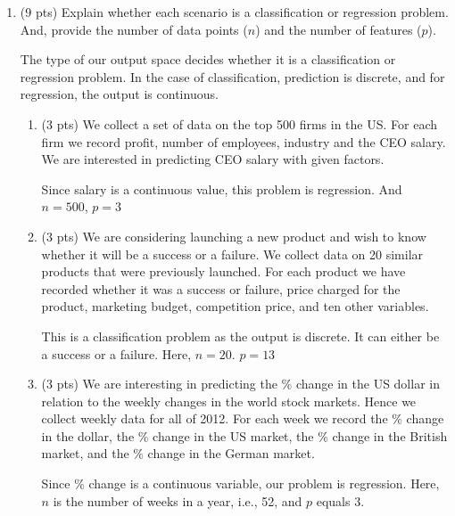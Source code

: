\documentclass[a4paper]{article}
\theoremstyle{definition}
\newenvironment{soln}{
    \leavevmode\color{blue}\ignorespaces
}{}
\begin{document}
\begin{enumerate}
\item (9 pts) Explain whether each scenario is a classification or regression problem. And, provide the number of data points ($n$) and the number of features ($p$).\\
\begin{soln}
    The type of our output space decides whether it is a classification or regression problem. In the case of classification, prediction is discrete, and for regression, the output is continuous. 
\end{soln}
\begin{enumerate}
	\item (3 pts) We collect a set of data on the top 500 firms in the US. For each firm we record profit, number of employees, industry and the CEO salary. We are interested in predicting CEO salary with given factors.
	
	\begin{soln}  Since salary is a continuous value, this problem is regression. And $n=500$, $p=3$ \end{soln}
	
	\item (3 pts) We are considering launching a new product and wish to know whether it will be a success or a failure. We collect data on 20 similar products that were previously launched. For each product we have recorded whether it was a success or failure, price charged for the product, marketing budget, competition price, and ten other variables.
	
	\begin{soln}  This is a classification problem as the output is discrete. It can either be a success or a failure. Here, $n=20$. $p=13$  \end{soln}
	
	\item (3 pts) We are interesting in predicting the \% change in the US dollar in relation to the weekly changes in the world stock markets. Hence we collect weekly data for all of 2012. For each week we record the \% change in the dollar, the \% change in the US market, the \% change in the British market, and the \% change in the German market.
	
	\begin{soln} Since \% change is a continuous variable, our problem is regression. Here, $n$ is the number of weeks in a year, i.e., 52, and $p$ equals 3.  \end{soln}
	

\end{enumerate}
\end{enumerate}
\end{document}
